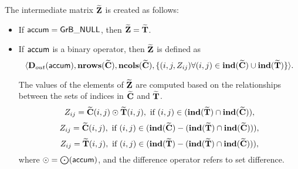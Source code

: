 
The intermediate matrix ${\bf \widetilde{Z}}$ is created as follows:
\begin{itemize}
    \item If ${\sf accum} = {\sf GrB\_NULL}$, then ${\bf \widetilde{Z}} = {\bf \widetilde{T}}$.

    \item If ${\sf accum}$ is a binary operator, then ${\bf \widetilde{Z}}$ is defined as
        \[ \langle \mbox{$\mathbf{D}_{out}$}({\sf accum}), \bold{nrows}({\bf \widetilde{C}}), \bold{ncols}({\bf \widetilde{C}}),
        \{(i,j,Z_{ij})  \forall (i,j) \in \bold{ind}({\bf \widetilde{C}}) \cup 
        \bold{ind}({\bf \widetilde{T}}) \} \rangle.\]

    The values of the elements of ${\bf \widetilde{Z}}$ are computed based on the
    relationships between the sets of indices in ${\bf \widetilde{C}}$ and 
    ${\bf \widetilde{T}}$.
\[
    Z_{ij} = {\bf \widetilde{C}}(i,j) \odot {\bf \widetilde{T}}(i,j), \ \mbox{if}\  
    (i,j) \in  (\bold{ind}({\bf \widetilde{T}}) \cap \bold{ind}({\bf \widetilde{C}})),
\]
\[
    Z_{ij} = {\bf \widetilde{C}}(i,j), \ \mbox{if}\  
    (i,j) \in (\bold{ind}({\bf \widetilde{C}}) - (\bold{ind}({\bf \widetilde{T}})
    \cap \bold{ind}({\bf \widetilde{C}}))),
\]
\[
    Z_{ij} = {\bf \widetilde{T}}(i,j), \ \mbox{if}\  (i,j) \in  
    (\bold{ind}({\bf \widetilde{T}}) - (\bold{ind}({\bf \widetilde{T}})
    \cap \bold{ind}({\bf \widetilde{C}}))),
\]
where $\odot  = \bigodot({\sf accum})$, and the difference operator refers to set difference.
\end{itemize}
